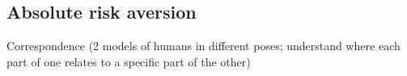 
\subsection{Absolute risk aversion}

Correspondence (2 models of humans in different poses; understand where each part of one relates to a specific part of the other)

